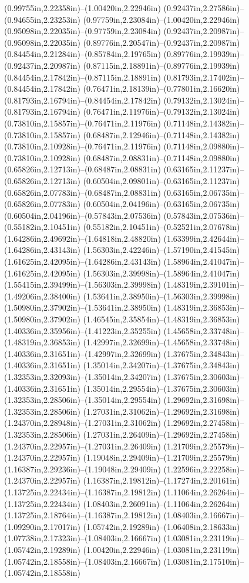 (0.99755in,2.22358in)--(1.00420in,2.22946in) (0.92437in,2.27586in)--(0.94655in,2.23253in) (0.97759in,2.23084in)--(1.00420in,2.22946in) (0.95098in,2.22035in)--(0.97759in,2.23084in) (0.92437in,2.20987in)--(0.95098in,2.22035in) (0.89776in,2.20547in)--(0.92437in,2.20987in) (0.84454in,2.21284in)--(0.85784in,2.19765in) (0.89776in,2.19939in)--(0.92437in,2.20987in) (0.87115in,2.18891in)--(0.89776in,2.19939in) (0.84454in,2.17842in)--(0.87115in,2.18891in) (0.81793in,2.17402in)--(0.84454in,2.17842in) (0.76471in,2.18139in)--(0.77801in,2.16620in) (0.81793in,2.16794in)--(0.84454in,2.17842in) (0.79132in,2.13024in)--(0.81793in,2.16794in) (0.76471in,2.11976in)--(0.79132in,2.13024in) (0.73810in,2.15857in)--(0.76471in,2.11976in) (0.71148in,2.14382in)--(0.73810in,2.15857in) (0.68487in,2.12946in)--(0.71148in,2.14382in) (0.73810in,2.10928in)--(0.76471in,2.11976in) (0.71148in,2.09880in)--(0.73810in,2.10928in) (0.68487in,2.08831in)--(0.71148in,2.09880in) (0.65826in,2.12713in)--(0.68487in,2.08831in) (0.63165in,2.11237in)--(0.65826in,2.12713in) (0.60504in,2.09801in)--(0.63165in,2.11237in) (0.65826in,2.07783in)--(0.68487in,2.08831in) (0.63165in,2.06735in)--(0.65826in,2.07783in) (0.60504in,2.04196in)--(0.63165in,2.06735in) (0.60504in,2.04196in)--(0.57843in,2.07536in) (0.57843in,2.07536in)--(0.55182in,2.10451in) (0.55182in,2.10451in)--(0.52521in,2.07678in) (1.64286in,2.49692in)--(1.64818in,2.48820in) (1.63399in,2.42644in)--(1.64286in,2.43143in) (1.56303in,2.42246in)--(1.57190in,2.41545in) (1.61625in,2.42095in)--(1.64286in,2.43143in) (1.58964in,2.41047in)--(1.61625in,2.42095in) (1.56303in,2.39998in)--(1.58964in,2.41047in) (1.55415in,2.39499in)--(1.56303in,2.39998in) (1.48319in,2.39101in)--(1.49206in,2.38400in) (1.53641in,2.38950in)--(1.56303in,2.39998in) (1.50980in,2.37902in)--(1.53641in,2.38950in) (1.48319in,2.36853in)--(1.50980in,2.37902in) (1.46545in,2.35854in)--(1.48319in,2.36853in) (1.40336in,2.35956in)--(1.41223in,2.35255in) (1.45658in,2.33748in)--(1.48319in,2.36853in) (1.42997in,2.32699in)--(1.45658in,2.33748in) (1.40336in,2.31651in)--(1.42997in,2.32699in) (1.37675in,2.34843in)--(1.40336in,2.31651in) (1.35014in,2.34207in)--(1.37675in,2.34843in) (1.32353in,2.32093in)--(1.35014in,2.34207in) (1.37675in,2.30603in)--(1.40336in,2.31651in) (1.35014in,2.29554in)--(1.37675in,2.30603in) (1.32353in,2.28506in)--(1.35014in,2.29554in) (1.29692in,2.31698in)--(1.32353in,2.28506in) (1.27031in,2.31062in)--(1.29692in,2.31698in) (1.24370in,2.28948in)--(1.27031in,2.31062in) (1.29692in,2.27458in)--(1.32353in,2.28506in) (1.27031in,2.26409in)--(1.29692in,2.27458in) (1.24370in,2.22957in)--(1.27031in,2.26409in) (1.21709in,2.25579in)--(1.24370in,2.22957in) (1.19048in,2.29409in)--(1.21709in,2.25579in) (1.16387in,2.29236in)--(1.19048in,2.29409in) (1.22596in,2.22258in)--(1.24370in,2.22957in) (1.16387in,2.19812in)--(1.17274in,2.20161in) (1.13725in,2.22434in)--(1.16387in,2.19812in) (1.11064in,2.26264in)--(1.13725in,2.22434in) (1.08403in,2.26091in)--(1.11064in,2.26264in) (1.13725in,2.18764in)--(1.16387in,2.19812in) (1.08403in,2.16667in)--(1.09290in,2.17017in) (1.05742in,2.19289in)--(1.06408in,2.18633in) (1.07738in,2.17323in)--(1.08403in,2.16667in) (1.03081in,2.23119in)--(1.05742in,2.19289in) (1.00420in,2.22946in)--(1.03081in,2.23119in) (1.05742in,2.18558in)--(1.08403in,2.16667in) (1.03081in,2.17510in)--(1.05742in,2.18558in) 